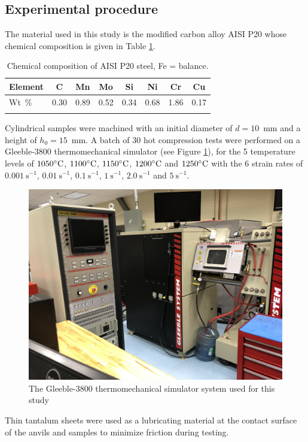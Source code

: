 \documentclass[twoside,english,1p,final,sort&compress]{elsarticle}
\theoremstyle{plain}
\DeclareRobustCommand{\ps}{\text{s}^{-1}}
\begin{document}
\subsection{Experimental procedure}

The material used in this study is the modified carbon alloy AISI P20 whose chemical composition is given in Table \ref{tab:Composition}.
\begin{table}[h!]
\centering
\caption{Chemical composition of AISI P20 steel, Fe = balance.}
\begin{tabular}{lccccccc}
	\hline
	Element &  C   &  Mn  &  Mo  &  Si  &  Ni  &  Cr  &  Cu  \\ \hline
	Wt~\%   & 0.30 & 0.89 & 0.52 & 0.34 & 0.68 & 1.86 & 0.17 \\ \hline
	\label{tab:Composition}
\end{tabular}
\end{table}
Cylindrical samples were machined with an initial diameter of $d=10$~mm and a height of $h_0=15$~mm.
A batch of 30 hot compression tests were performed on a Gleeble-3800 thermomechanical simulator (see Figure \ref{fig:Gleeble3800}), for the 5 temperature levels of $1050\celsius$, $1100\celsius$, $1150\celsius$, $1200\celsius$ and $1250\celsius$ with the 6 strain rates of $0.001~\ps$, $0.01~\ps$, $0.1~\ps$, $1~\ps$, $2.0~\ps$ and $5~\ps$.
\begin{figure}[!ht]
\centering
\includegraphics[width=0.7\columnwidth]{Figures/Gleeble-3800}
\caption{The Gleeble-3800 thermomechanical simulator system used for this study}
\label{fig:Gleeble3800}
\end{figure}
Thin tantalum sheets were used as a lubricating material at the contact surface of the anvils and samples to minimize friction during testing.
\end{document}
